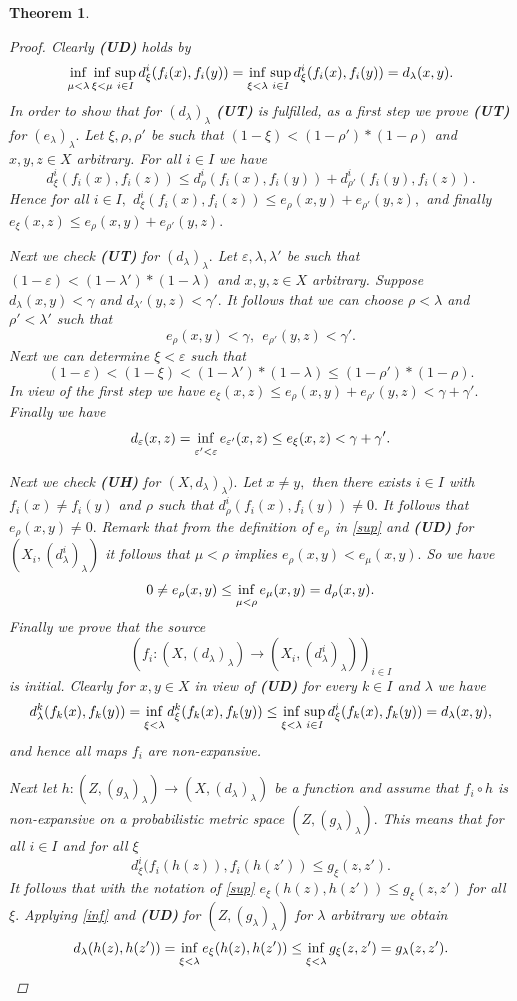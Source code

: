 \documentclass[12pt,a4paper]{amsart}
\theoremstyle{theorem}
\newtheorem{theorem}{Theorem}[section]
\theoremstyle{definition}
\renewcommand{\inf}{\myinf}
\DeclareMathOperator*{\myinf}{in\vphantom{p}f}
\newcommand{\ve}{\ensuremath{\varepsilon}}
\renewcommand{\l}{\ensuremath{\lambda}}
\def\rw{\rightarrow}
\begin{document}
{\begin{theorem}
\begin{proof}
Clearly {\bf(UD)} holds by
$$
\inf_{\mu < \l} \inf_{\xi < \mu} \sup_{i \in I} d^i_\xi (f_i(x) , f_i(y) )= \inf_{\xi < \l} \sup_{i \in I} d^i_\xi (f_i(x) , f_i(y) ) = d_\l(x,y).
$$
In order to show that  for $(d_\l)_\l$  {\bf(UT)} is fulfilled, as a first step we prove {\bf(UT)} for $(e_\l)_\l.$
Let $\xi, \rho, \rho'$ be such that $(1-\xi )< (1 - \rho') * (1 - \rho)$ and $x,y,z \in X$ arbitrary.
For all $i \in I$ we have 
$$
d^i_\xi(f_i(x), f_i(z)) \leq d^i_\rho(f_i(x), f_i(y)) +d^i_{\rho'}(f_i(y), f_i(z)). 
$$
Hence for all $i \in I,$ 
$
d^i_\xi(f_i(x), f_i(z)) \leq e_\rho(x,y) +e_{\rho'} (y,z),
$
and finally $e_\xi (x,z) \leq e_\rho(x,y) +e_{\rho'} (y,z).$

Next we check {\bf(UT)} for $(d_\l)_\l.$ Let $\ve, \l, \l'$ be such that $(1-\ve )< (1 - \l') * (1 - \l)$ and $x,y,z \in X$ arbitrary.
Suppose $d_\l(x,y) < \gamma$ and $d_{\l'}(y,z) < \gamma'.$ 
It follows that we can choose $\rho < \l$ and $\rho' < \l'$ such that 
$$
e_\rho (x,y) < \gamma, \ \  e_{\rho'} (y,z) < \gamma'.
$$
Next we can determine $\xi < \ve $ such that 
$$
(1- \ve) < (1 - \xi) < (1 - \l') * (1 - \l) \leq (1 - \rho') * (1 - \rho).
$$
In view of the first step we have $e_\xi (x,z) \leq e_\rho(x,y) +e_{\rho'} (y,z) < \gamma + \gamma'.$
Finally we have
$$
d_\ve (x,z) = \inf_{\ve' < \ve} e_{\ve'} (x,z) \leq e_\xi (x,z) < \gamma + \gamma'.
$$

Next we check {\bf(UH)} for $(X, d_\l)_\l).$ Let $x \not = y,$ then there exists $i \in I$ with $f_i(x) \not = f_i (y)$ and
$\rho$ such that $d^i_\rho (f_i(x) , f_i(y) ) \not = 0.$ It follows that $e_\rho (x,y) \not = 0.$
Remark that from the definition of $e_\rho$ in \eqref{sup} and  {\bf(UD)} for $(X_i, (d^i_\l)_\l)$ it follows that $\mu < \rho$ implies $e_\rho(x,y) < e_\mu (x,y).$
So we have
$$
0\not = e_\rho (x,y) \leq \inf_{\mu < \rho }e_\mu(x,y) = d_\rho (x,y).
$$
Finally we prove that the source 
$$
(f_i: (X, (d_\l )_\l)\rw (X_i, (d^i_\l)_\l))_{i \in I}
$$
is initial. Clearly for $x,y \in X$ in view of {\bf(UD)}  for every $k \in I$  and $\l$ we have
$$
d^k_\l(f_k(x) , f_k (y)) = \inf_{\xi < \l} d^k_\xi(f_k(x) , f_k (y)) \leq  \inf_{\xi < \l} \sup_{i \in I}d^i_\xi(f_k(x) , f_k (y))  = d_\l (x,y), 
$$
and hence all maps $f_i$ are non-expansive.

Next let $h: (Z, (g_\l)_\l) \rw (X, (d_\l )_\l)$ be a function and assume that $f_i \circ h$ is non-expansive on a probabilistic metric space $(Z, (g_\l)_\l).$ 
This means that for all $i \in I$ and for all $\xi$
$$ d^i_\xi (f_i(h(z)), f_i(h(z')) \leq g_\xi(z,z').$$
It follows that with the notation of \eqref{sup} $e_\xi(h(z), h(z')) \leq g_\xi(z,z')$ for all $\xi.$
Applying \eqref{inf} and {\bf(UD)} for $(Z, (g_\l)_\l)$   for $\l$ arbitrary we obtain
$$
d_\l (h(z), h(z')) = \inf_{\xi < \l} e_\xi(h(z), h(z')) \leq  \inf_{\xi < \l} g_\xi(z,z')= g_\l(z,z').
$$
\end{proof}
\end{theorem}

}
\end{document}
